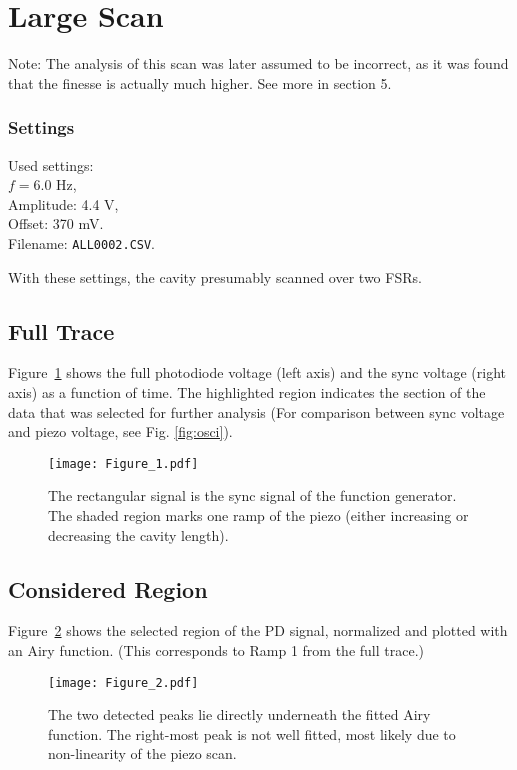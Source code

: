 \section{Large Scan}
Note: The analysis of this scan was later assumed to be incorrect, as it was found that the finesse is actually much higher. See more in section 5.
\subsubsection*{Settings}
Used settings:  \\
$f = 6.0$ Hz,  \\
Amplitude: 4.4 V,  \\
Offset: 370 mV.  \\
Filename: \texttt{ALL0002.CSV}.  


With these settings, the cavity presumably scanned over two FSRs.

\subsection{Full Trace}
Figure~\ref{fig:full} shows the full photodiode voltage (left axis) and the
sync voltage (right axis) as a function of time. The highlighted region
indicates the section of the data that was selected for further analysis (For comparison between sync voltage and piezo voltage, see Fig. \ref{fig:osci}).

\begin{figure}[H]
    \centering
    \texttt{[image: Figure\_1.pdf]}
    \caption{The rectangular signal is the sync signal of the function generator. The shaded region marks one ramp of the piezo (either increasing or decreasing the cavity length).}
    \label{fig:full}
\end{figure}

\subsection{Considered Region}
Figure~\ref{fig:fit} shows the selected region of the PD signal, normalized and
plotted with an Airy function. (This corresponds to Ramp 1 from the full trace.)

\begin{figure}[H]
    \centering
    \texttt{[image: Figure\_2.pdf]}
    \caption{The two detected peaks lie directly underneath the fitted Airy function. The right-most peak is not well fitted, most likely due to non-linearity of the piezo scan.}
    \label{fig:fit}
\end{figure}

